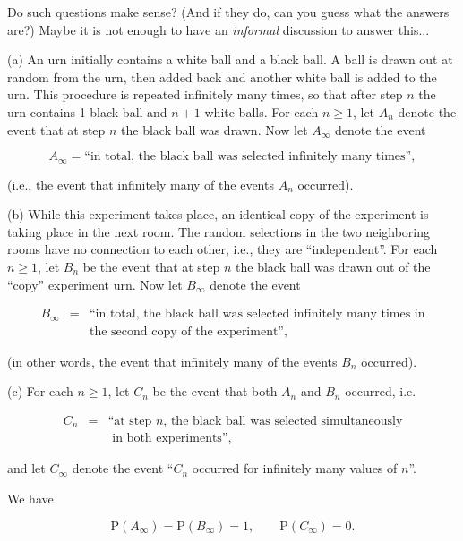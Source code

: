 \noindent Do such questions make sense? (And if they do, can
you guess what the answers are?) Maybe it is not
enough to have an \emph{informal} discussion to answer
this...

\begin{example}
(a) An urn initially contains a white ball and a
black ball. A ball is drawn out at random from the
urn, then added back and another white ball is added
to the urn. This procedure is repeated infinitely many
times, so that after step $n$ the urn contains 1
black ball and $n+1$ white balls. For each $n\ge1$,
let $A_n$ denote the event that at step $n$ the black
ball was drawn. Now let $A_\infty$ denote the event

\[
A_\infty = \textrm{``in total, the black ball was selected infinitely many times''},
\]

\noindent (i.e., the event that infinitely many of the events
$A_n$ occurred).

(b) While this experiment takes place, an identical
copy of the experiment is taking place in the next
room. The random selections in the two neighboring
rooms have no connection to each other, i.e., they are
``independent''. For each $n\ge 1$, let $B_n$ be the
event that at step $n$ the black ball was drawn out
of the ``copy'' experiment urn. Now let $B_\infty$
denote the event

\begin{eqnarray*}
B_\infty &=& \textrm{``in total, the black ball was selected infinitely many times in}\\&&
\textrm{the second copy of the experiment''},
\end{eqnarray*}

\noindent (in other words, the event that infinitely many of
the events $B_n$ occurred).

(c) For each $n\ge 1$, let $C_n$ be the event that
both $A_n$ and $B_n$ occurred, i.e.

\begin{eqnarray*}
C_n &=& \textrm{``at step $n$, the black ball was selected simultaneously}
\\&& \textrm{ in both experiments'',}
\end{eqnarray*}

\noindent and let $C_\infty$ denote the event ``$C_n$ occurred
for infinitely many values of $n$''.
\end{example}

\begin{thm}
We have

\[
\mathrm{P}(A_\infty) = \mathrm{P}(B_\infty) = 1, \qquad \mathrm{P}(C_\infty) = 0.
\]

\end{thm}

